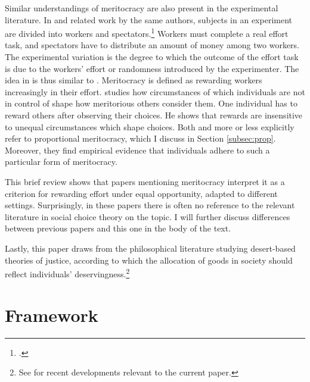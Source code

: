 Similar understandings of meritocracy are also present in the experimental literature. In \cite{cappelenMeritPrimacyEffect2023} and related work by the same authors, subjects in an experiment are divided into workers and spectators.\footnote{\cite{cappelenFairUnfairIncome2020,cappelenMeritocraticOriginEgalitarian2022,cappelenFairnessLimitedInformation2024}.} Workers must complete a real effort task, and spectators have to distribute an amount of money among two workers. The experimental variation is the degree to which the outcome of the effort task is due to the workers' effort or randomness introduced by the experimenter. The idea in \cite{cappelenMeritPrimacyEffect2023} is thus similar to \cite{morganLimitsMeritocracy2022}. Meritocracy is defined as rewarding workers increasingly in their effort. \cite{andreShallowMeritocracy2024} studies how circumstances of which individuals are not in control of shape how meritorious others consider them. One individual has to reward others after observing their choices. He shows that rewards are insensitive to unequal circumstances which shape choices. Both \cite{andreShallowMeritocracy2024} and \cite{cappelenFairnessLimitedInformation2024} more or less explicitly refer to proportional meritocracy, which I discuss in Section \ref{subsec:prop}. Moreover, they find empirical evidence that individuals adhere to such a particular form of meritocracy.

This brief review shows that papers mentioning meritocracy interpret it as a criterion for rewarding effort under equal opportunity, adapted to different settings. Surprisingly, in these papers there is often no reference to the relevant literature in social choice theory on the topic. I will further discuss differences between previous papers and this one in the body of the text.

Lastly, this paper draws from the philosophical literature studying desert-based theories of justice, according to which the allocation of goods in society should reflect individuals' deservingness.\footnote{See \cite{arnesonDesertEquality2007,kaganGeometryDesert2014,sep-meritocracy} for recent developments relevant to the current paper.}

\section{Framework}\label{sec:modelmerit}


